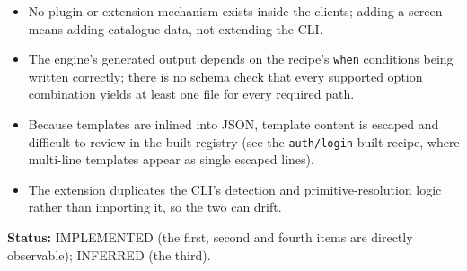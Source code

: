 \begin{itemize}
  \item No plugin or extension mechanism exists inside the clients; adding a screen
        means adding catalogue data, not extending the CLI.
  \item The engine's generated output depends on the recipe's \texttt{when}
        conditions being written correctly; there is no schema check that every
        supported option combination yields at least one file for every required
        path.
  \item Because templates are inlined into JSON, template content is escaped and
        difficult to review in the built registry (see the \texttt{auth/login}
        built recipe, where multi-line templates appear as single escaped lines).
  \item The extension duplicates the CLI's detection and primitive-resolution logic
        rather than importing it, so the two can drift.
\end{itemize}

\textbf{Status:} IMPLEMENTED (the first, second and fourth items are directly
observable); INFERRED (the third).
